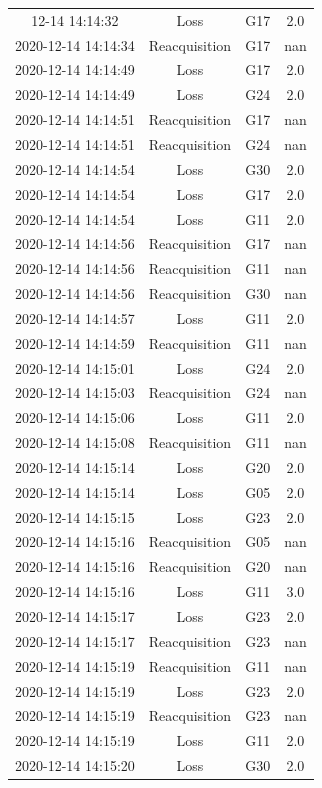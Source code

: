 \begin{enumerate}
\begin{longtabu}{cccc}
\hline%
\endfoot%
\hline%
12{-}14 14:14:32&Loss&G17&2.0\\%
2020{-}12{-}14 14:14:34&Reacquisition&G17&nan\\%
2020{-}12{-}14 14:14:49&Loss&G17&2.0\\%
2020{-}12{-}14 14:14:49&Loss&G24&2.0\\%
2020{-}12{-}14 14:14:51&Reacquisition&G17&nan\\%
2020{-}12{-}14 14:14:51&Reacquisition&G24&nan\\%
2020{-}12{-}14 14:14:54&Loss&G30&2.0\\%
2020{-}12{-}14 14:14:54&Loss&G17&2.0\\%
2020{-}12{-}14 14:14:54&Loss&G11&2.0\\%
2020{-}12{-}14 14:14:56&Reacquisition&G17&nan\\%
2020{-}12{-}14 14:14:56&Reacquisition&G11&nan\\%
2020{-}12{-}14 14:14:56&Reacquisition&G30&nan\\%
2020{-}12{-}14 14:14:57&Loss&G11&2.0\\%
2020{-}12{-}14 14:14:59&Reacquisition&G11&nan\\%
2020{-}12{-}14 14:15:01&Loss&G24&2.0\\%
2020{-}12{-}14 14:15:03&Reacquisition&G24&nan\\%
2020{-}12{-}14 14:15:06&Loss&G11&2.0\\%
2020{-}12{-}14 14:15:08&Reacquisition&G11&nan\\%
2020{-}12{-}14 14:15:14&Loss&G20&2.0\\%
2020{-}12{-}14 14:15:14&Loss&G05&2.0\\%
2020{-}12{-}14 14:15:15&Loss&G23&2.0\\%
2020{-}12{-}14 14:15:16&Reacquisition&G05&nan\\%
2020{-}12{-}14 14:15:16&Reacquisition&G20&nan\\%
2020{-}12{-}14 14:15:16&Loss&G11&3.0\\%
2020{-}12{-}14 14:15:17&Loss&G23&2.0\\%
2020{-}12{-}14 14:15:17&Reacquisition&G23&nan\\%
2020{-}12{-}14 14:15:19&Reacquisition&G11&nan\\%
2020{-}12{-}14 14:15:19&Loss&G23&2.0\\%
2020{-}12{-}14 14:15:19&Reacquisition&G23&nan\\%
2020{-}12{-}14 14:15:19&Loss&G11&2.0\\%
2020{-}12{-}14 14:15:20&Loss&G30&2.0\\%

\end{longtabu}
\end{enumerate}
